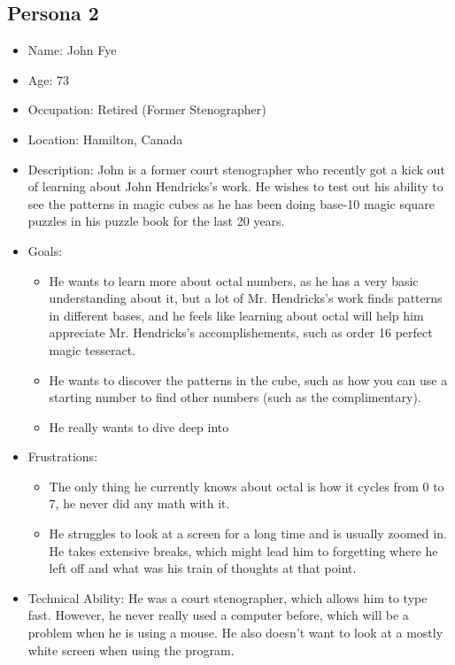 \documentclass[12pt]{article}
\begin{document}
\subsection{Persona 2}
\begin{itemize}
\item Name: John Fye
\item Age: 73
\item Occupation: Retired (Former Stenographer)
\item Location: Hamilton, Canada
\item Description: John is a former court stenographer who recently got a kick out of learning about John Hendricks's work. He wishes to test out his ability to see the patterns in magic cubes as he has been doing base-10 magic square puzzles in his puzzle book for the last 20 years.
\item Goals:
\begin{itemize}
  \item He wants to learn more about octal numbers, as he has a very basic understanding about it, but a lot of Mr. Hendricks's work finds patterns in different bases, and he feels like learning about octal will help him appreciate Mr. Hendricks's accomplishements, such as order 16 perfect magic tesseract.
  \item He wants to discover the patterns in the cube, such as how you can use a starting number to find other numbers (such as the complimentary).
  \item He really wants to dive deep into 
\end{itemize}
\item Frustrations:
\begin{itemize}
  \item The only thing he currently knows about octal is how it cycles from 0 to 7, he never did any math with it.
  \item He struggles to look at a screen for a long time and is usually zoomed in. He takes extensive breaks, which might lead him to forgetting where he left off and what was his train of thoughts at that point.
\end{itemize}
\item Technical Ability: He was a court stenographer, which allows him to type fast. However, he never really used a computer before, which will be a problem when he is using a mouse. He also doesn't want to look at a mostly white screen when using the program.
\end{itemize}
\end{document}
